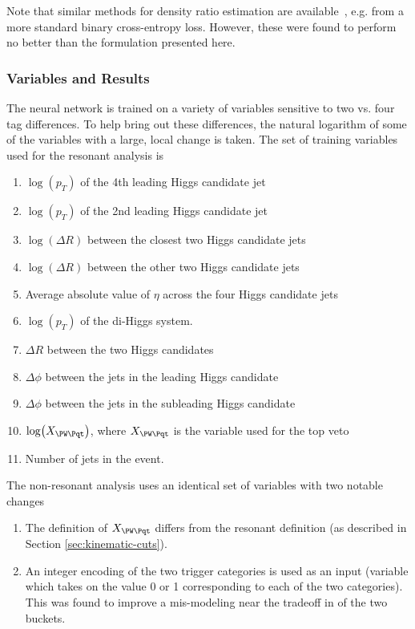 Note that similar methods for density ratio estimation are available~\cite{NNRW-Nachman},
e.g. from a more standard binary cross-entropy loss. However, these were found to
perform no better than the formulation presented here.

\subsubsection{Variables and Results}
The neural network is trained on a variety of variables sensitive to two vs.
four tag differences. To help bring out these differences, the natural logarithm 
of some of the variables with a large, local change is taken. The 
set of training variables used for the resonant analysis is
\begin{enumerate}
	\item $\log(p_T)$ of the 4th leading Higgs candidate jet
	\item $\log(p_T)$ of the 2nd leading Higgs candidate jet
	\item $\log(\Delta R)$ between the closest two Higgs candidate jets
	\item $\log(\Delta R)$ between the other two Higgs candidate jets
	\item Average absolute value of $\eta$ across the four Higgs candidate jets
	\item $\log(p_T)$ of the di-Higgs system.
	\item $\Delta R$ between the two Higgs candidates
	\item $\Delta \phi$ between the jets in the leading Higgs candidate
	\item $\Delta \phi$ between the jets in the subleading Higgs candidate
	\item $\log(X_{\PW\Pqt})$, where $X_{\PW\Pqt}$ is the variable used for the top veto
	\item Number of jets in the event.
\end{enumerate}
The non-resonant analysis uses an identical set of variables with two notable changes
\begin{enumerate}
	\item The definition of $X_{\PW\Pqt}$ differs from the resonant definition (as described 
	in Section \ref{sec:kinematic-cuts}).
	\item An integer encoding of the two trigger categories is used as an input (variable which 
	takes on the value 0 or 1 corresponding to each of the two categories). This was found to improve
	a mis-modeling near the tradeoff in \mhh of the two buckets.
\end{enumerate}

